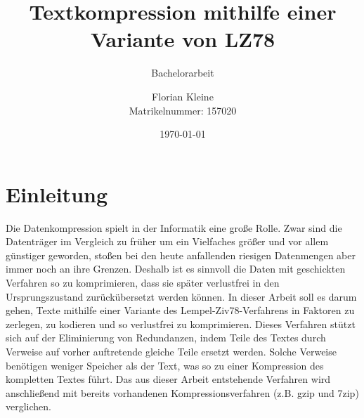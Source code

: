 \documentclass[a4paper,11pt]{scrartcl}%
\title{\vspace{2,5cm}Textkompression mithilfe einer Variante von LZ78}
\subtitle{Bachelorarbeit}
\author{Florian Kleine\\Matrikelnummer: 157020}
\date{\today}
\theoremstyle{change}
\theoremstyle{nonumberplain}
\theoremstyle{change}
\theoremstyle{nonumberplain}
\theoremstyle{change}
\theoremstyle{nonumberplain}
\begin{document}
\maketitle
\thispagestyle{empty}
\newpage
\tableofcontents
\newpage
\newpage

\section{Einleitung}
Die Datenkompression spielt in der Informatik eine große Rolle. Zwar sind die Datenträger im Vergleich zu früher um ein Vielfaches größer und vor allem günstiger geworden, stoßen bei den heute anfallenden riesigen Datenmengen aber immer noch an ihre Grenzen. Deshalb ist es sinnvoll die Daten mit geschickten Verfahren so zu komprimieren, dass sie später verlustfrei in den Ursprungszustand zurückübersetzt werden können.
In dieser Arbeit soll es darum gehen, Texte mithilfe einer Variante des Lempel-Ziv78-Verfahrens in Faktoren zu zerlegen, zu kodieren und so verlustfrei zu komprimieren. Dieses Verfahren stützt sich auf der Eliminierung von Redundanzen, indem Teile des Textes durch Verweise auf vorher auftretende gleiche Teile ersetzt werden. Solche Verweise benötigen weniger Speicher als der Text, was so zu einer Kompression des kompletten Textes führt.
Das aus dieser Arbeit entstehende Verfahren wird anschließend mit bereits vorhandenen Kompressionsverfahren (z.B. gzip und 7zip) verglichen.\\\\
\end{document}
